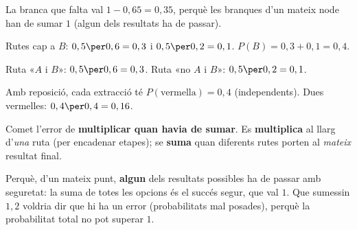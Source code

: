 \begin{solucions}
\begin{sollist}
  \item La branca que falta val $1-0,65=0,35$, perquè les branques d'un mateix node han
        de sumar $1$ (algun dels resultats ha de passar).
  \item Rutes cap a $B$: $0,5\per 0,6=0,3$ i $0,5\per 0,2=0,1$.
        $P(B)=0,3+0,1=0,4$.
  \item Ruta «$A$ i $B$»: $0,5\per 0,6=0,3$. Ruta «no $A$ i $B$»: $0,5\per 0,2=0,1$.
  \item Amb reposició, cada extracció té $P(\text{vermella})=0,4$ (independents). Dues
        vermelles: $0,4\per 0,4=0,16$.
  \item Comet l'error de \textbf{multiplicar quan havia de sumar}. Es \textbf{multiplica}
        al llarg d'\emph{una} ruta (per encadenar etapes); se \textbf{suma} quan
        diferents rutes porten al \emph{mateix} resultat final.
  \item Perquè, d'un mateix punt, \textbf{algun} dels resultats possibles ha de passar
        amb seguretat: la suma de totes les opcions és el succés segur, que val $1$. Que
        sumessin $1,2$ voldria dir que hi ha un error (probabilitats mal posades), perquè
        la probabilitat total no pot superar $1$.
\end{sollist}
\end{solucions}
